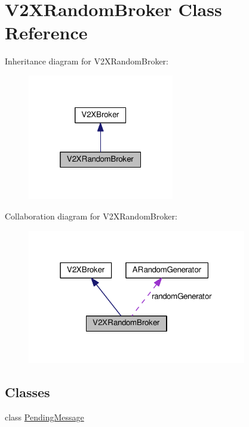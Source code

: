 \hypertarget{classV2XRandomBroker}{}\section{V2\+X\+Random\+Broker Class Reference}
\label{classV2XRandomBroker}


Inheritance diagram for V2\+X\+Random\+Broker\+:\nopagebreak
\begin{figure}[H]
\begin{center}
\leavevmode
\includegraphics[width=181pt]{classV2XRandomBroker__inherit__graph}
\end{center}
\end{figure}


Collaboration diagram for V2\+X\+Random\+Broker\+:\nopagebreak
\begin{figure}[H]
\begin{center}
\leavevmode
\includegraphics[width=271pt]{classV2XRandomBroker__coll__graph}
\end{center}
\end{figure}
\subsection*{Classes}
\begin{DoxyCompactItemize}
\item 
class \hyperlink{classV2XRandomBroker_1_1PendingMessage}{Pending\+Message}
\end{DoxyCompactItemize}
